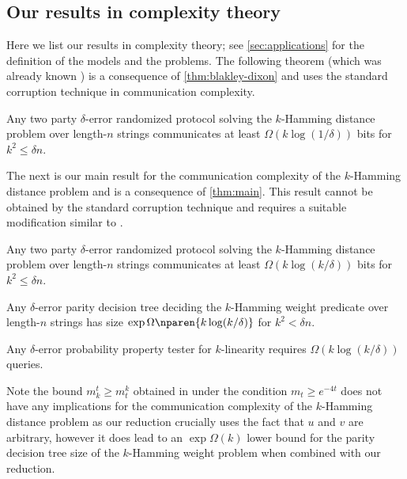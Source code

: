 \subsection{Our results in complexity theory}
\label{sec:results-cc}
Here we list our results in complexity theory; see
\autoref{sec:applications} for the definition
of the models and the problems.
The following theorem 
(which was already known \cite{BlaisBG2014})
is a consequence of \autoref{thm:blakley-dixon} 
and uses the standard corruption technique in 
communication complexity.
\begin{theorem}
\label{thm:klogdelta}
Any two party $\delta$-error randomized protocol
solving the $k$-Hamming distance problem 
over length-$n$ strings communicates 
at least $\Omega(k\log (1/\delta))$ 
bits for $k^2\le \delta n$.
\end{theorem}
The next is our main result for the communication 
complexity of the $k$-Hamming distance problem
and is a consequence of \autoref{thm:main}. 
This result cannot be obtained by the standard 
corruption technique and
requires a suitable modification similar to 
\cite{Sherstov2012}.
\begin{theorem}
\label{thm:klogk}
Any two party $\delta$-error randomized protocol
solving the $k$-Hamming distance problem 
over length-$n$ strings communicates 
at least $\Omega(k\log (k/\delta))$ 
bits for $k^2\le \delta n$.
\end{theorem}
\begin{theorem}
\label{thm:paritysize}
Any $\delta$-error parity decision tree 
deciding the $k$-Hamming weight predicate 
over length-$n$ strings
has size $\exp \Omega\nparen{k\log (k/\delta)}$
for $k^2< \delta n$.
\end{theorem}
\begin{corollary}
\label{cor:propertytest}
Any $\delta$-error probability 
property tester for 
$k$-linearity requires 
$\Omega(k\log (k/\delta))$ queries.
\end{corollary}

Note the bound $m_k^t\ge m_t^k$ obtained in 
\cite{BlakleyD1966} under the condition $m_t\ge e^{-4t}$ 
does not have any implications for the communication 
complexity of the $k$-Hamming distance problem as our 
reduction crucially uses the fact that $u$ and $v$ are 
arbitrary, however it does lead to an $\exp\Omega(k)$ 
lower bound for the parity decision tree size of the 
$k$-Hamming weight problem when combined with our 
reduction.

